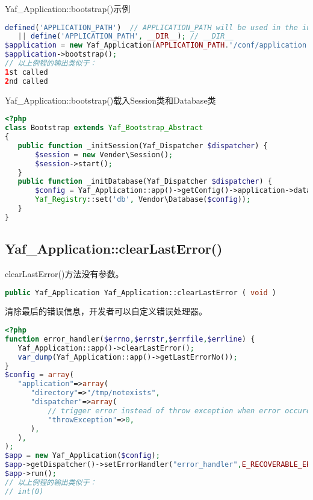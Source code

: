 \begin{example}
Yaf\_Application::bootstrap()示例
\begin{lstlisting}[language=PHP]
defined('APPLICATION_PATH')  // APPLICATION_PATH will be used in the ini config file
   || define('APPLICATION_PATH', __DIR__); // __DIR__
$application = new Yaf_Application(APPLICATION_PATH.'/conf/application.ini');
$application->bootstrap();
// 以上例程的输出类似于：
1st called
2nd called
\end{lstlisting}
\end{example}


\begin{example}
Yaf\_Application::bootstrap()载入Session类和Database类
\begin{lstlisting}[language=PHP]
<?php
class Bootstrap extends Yaf_Bootstrap_Abstract 
{
   public function _initSession(Yaf_Dispatcher $dispatcher) {
       $session = new Vender\Session();
       $session->start();
   }
   public function _initDatabase(Yaf_Dispatcher $dispatcher) {
       $config = Yaf_Application::app()->getConfig()->application->database;
       Yaf_Registry::set('db', Vendor\Database($config));
   }
}
\end{lstlisting}
\end{example}

\subsection{Yaf\_Application::clearLastError()}

clearLastError()方法没有参数。

\begin{lstlisting}[language=PHP]
public Yaf_Application Yaf_Application::clearLastError ( void )
\end{lstlisting}

清除最后的错误信息，开发者可以自定义错误处理器。


\begin{lstlisting}[language=PHP]
<?php
function error_handler($errno,$errstr,$errfile,$errline) {
   Yaf_Application::app()->clearLastError();
   var_dump(Yaf_Application::app()->getLastErrorNo());
}
$config = array(
   "application"=>array(
      "directory"=>"/tmp/notexists",
      "dispatcher"=>array(
          // trigger error instead of throw exception when error occure
          "throwException"=>0,
      ),
   ),
);
$app = new Yaf_Application($config);
$app->getDispatcher()->setErrorHandler("error_handler",E_RECOVERABLE_ERROR);
$app->run();
// 以上例程的输出类似于：
// int(0)
\end{lstlisting}





